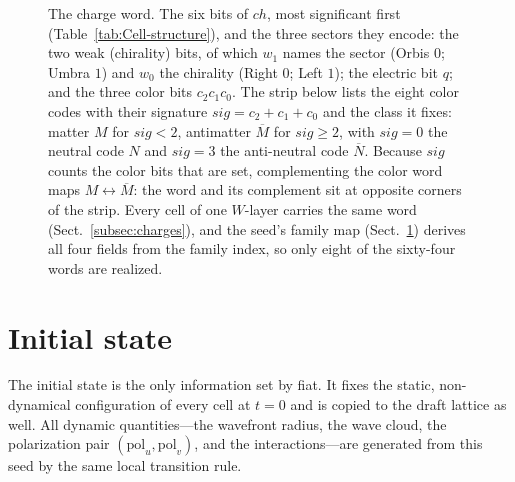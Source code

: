 \documentclass[a4paper]{article}
\begin{document}
\begin{figure}[htbp]
\caption{The charge word. \label{fig:charge-word} The six bits of $ch$, most significant first
(Table~\ref{tab:Cell-structure}), and the three sectors they encode: the two weak (chirality) bits, of
which $w_1$ names the sector (Orbis $0$; Umbra $1$) and $w_0$ the chirality (Right $0$; Left $1$); the
electric bit $q$; and the three color bits $c_2c_1c_0$. The strip below lists the eight color codes
with their signature $sig=c_2+c_1+c_0$ and the class it fixes: matter $M$ for $sig<2$, antimatter
$\overline M$ for $sig\ge2$, with $sig=0$ the neutral code $N$ and $sig=3$ the anti-neutral code
$\overline N$. Because $sig$ counts the color bits that are set, complementing the color word maps
$M\leftrightarrow\overline M$: the word and its complement sit at opposite corners of the strip. Every
cell of one $W$-layer carries the same word (Sect.~\ref{subsec:charges}), and the seed's family map
(Sect.~\ref{initial-state}) derives all four fields from the family index, so only eight of the
sixty-four words are realized.}
\end{figure}



\section{Initial state}\label{initial-state}
The initial state is the only information set by fiat.  It fixes the static, non-dynamical configuration of every cell at $t=0$ and is copied to the draft lattice as well.  All dynamic quantities---the wavefront radius, the wave cloud, the polarization pair $(\mathrm{pol}_u,\mathrm{pol}_v)$, and the interactions---are generated from this seed by the same local transition rule.
\end{document}

